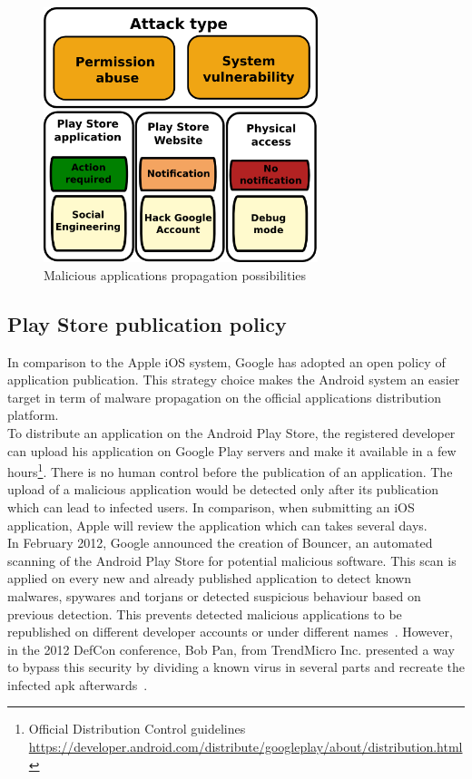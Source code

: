 \begin{figure}[h]
  \centering
  \includegraphics[width=8cm]{images/secu-graph.png}
  \caption{Malicious applications propagation possibilities}
  \label{fig:secu-graph}
\end{figure}

\subsection{Play Store publication policy}
\label{sec:playstore-publication-policy}

In comparison to the Apple iOS system, Google has adopted an open policy of application publication.
This strategy choice makes the Android system an easier target in term of malware propagation on the official applications distribution platform.\\

To distribute an application on the Android Play Store, the registered developer can upload his application on Google Play servers and make it available in a few hours\footnote{Official Distribution Control guidelines \url{https://developer.android.com/distribute/googleplay/about/distribution.html}}.
There is no human control before the publication of an application.
The upload of a malicious application would be detected only after its publication which can lead to infected users.
In comparison, when submitting an iOS application, Apple will review the application which can takes several days.\\

In February 2012, Google announced the creation of Bouncer, an automated scanning of the Android Play Store for potential malicious software.
This scan is applied on every new and already published application to detect known malwares, spywares and torjans or detected suspicious behaviour based on previous detection.
This prevents detected malicious applications to be republished on different developer accounts or under different names~\cite{secu-bouncer}.
However, in the 2012 DefCon conference, Bob Pan, from TrendMicro Inc. presented a way to bypass this security by dividing a known virus in several parts and recreate the infected apk afterwards~\cite{secu-defcon}.\\

